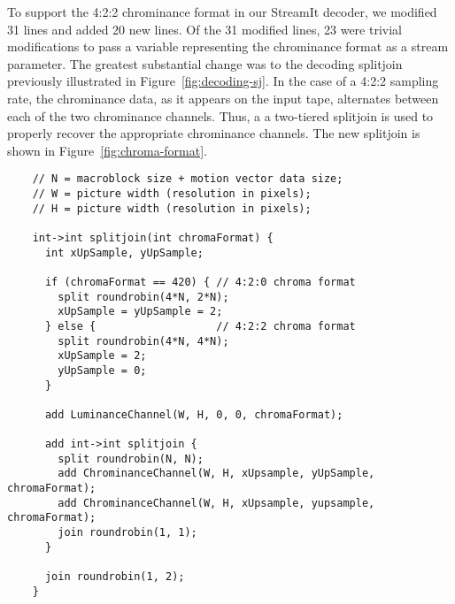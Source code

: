 To support the 4:2:2 chrominance format in our StreamIt decoder, we
modified 31 lines and added 20 new lines. Of the 31 modified lines, 23
were trivial modifications to pass a variable representing the
chrominance format as a stream parameter. The greatest substantial
change was to the decoding splitjoin previously illustrated in
Figure~\ref{fig:decoding-sj}. In the case of a 4:2:2 sampling rate,
the chrominance data, as it appears on the input tape, alternates
between each of the two chrominance channels. Thus, a a two-tiered
splitjoin is used to properly recover the appropriate chrominance
channels. The new splitjoin is shown in Figure~\ref{fig:chroma-format}.
\begin{figure*}[t]
 \begin{minipage}[t]{4.0in}
   {
    \begin{scriptsize}
    \begin{verbatim} 
    // N = macroblock size + motion vector data size;
    // W = picture width (resolution in pixels);
    // H = picture width (resolution in pixels);

    int->int splitjoin(int chromaFormat) {
      int xUpSample, yUpSample;

      if (chromaFormat == 420) { // 4:2:0 chroma format
        split roundrobin(4*N, 2*N);
        xUpSample = yUpSample = 2;
      } else {                   // 4:2:2 chroma format
        split roundrobin(4*N, 4*N);
        xUpSample = 2;
        yUpSample = 0;
      }

      add LuminanceChannel(W, H, 0, 0, chromaFormat);

      add int->int splitjoin {
        split roundrobin(N, N);
        add ChrominanceChannel(W, H, xUpsample, yUpSample, chromaFormat);
        add ChrominanceChannel(W, H, xUpsample, yupsample, chromaFormat);
        join roundrobin(1, 1);
      }

      join roundrobin(1, 2);
    }
    \end{verbatim}
    \end{scriptsize}
   }
   \caption{Decoding stream to handle 4:2:0 and 4:2:2 chroma formats.}
   \label{fig:chroma-stream}
  \end{minipage}
  \begin{minipage}[t]{2.0in}
  {
   \begin{center}
    \caption{4:2:0 and 4:2:2 chrominance formats showing macroblock ordering}
    \label{fig:chroma-format}
   \end{center}
  }
  \end{minipage}
\end{figure*}



